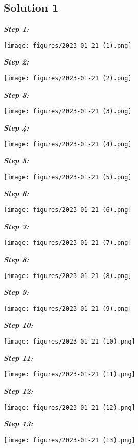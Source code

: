 \subsection{Solution 1}
    \textbf{\textit{Step 1:}}\par
    \texttt{[image: figures/2023-01-21 (1).png]}\par
    \newpage
    \textbf{\textit{Step 2:}}\par
    \texttt{[image: figures/2023-01-21 (2).png]}\par
    \textbf{\textit{Step 3:}}\par
    \texttt{[image: figures/2023-01-21 (3).png]}\par
    \textbf{\textit{Step 4:}}\par
    \texttt{[image: figures/2023-01-21 (4).png]}\par
    \textbf{\textit{Step 5:}}\par
    \texttt{[image: figures/2023-01-21 (5).png]}\par
    \textbf{\textit{Step 6:}}\par
    \texttt{[image: figures/2023-01-21 (6).png]}\par
    \textbf{\textit{Step 7:}}\par
    \texttt{[image: figures/2023-01-21 (7).png]}\par
    \textbf{\textit{Step 8:}}\par
    \texttt{[image: figures/2023-01-21 (8).png]}\par
    \textbf{\textit{Step 9:}}\par
    \texttt{[image: figures/2023-01-21 (9).png]}\par
    \textbf{\textit{Step 10:}}\par
    \texttt{[image: figures/2023-01-21 (10).png]}\par
    \textbf{\textit{Step 11:}}\par
    \texttt{[image: figures/2023-01-21 (11).png]}\par
    \textbf{\textit{Step 12:}}\par
    \texttt{[image: figures/2023-01-21 (12).png]}\par
    \textbf{\textit{Step 13:}}\par
    \texttt{[image: figures/2023-01-21 (13).png]}\par
